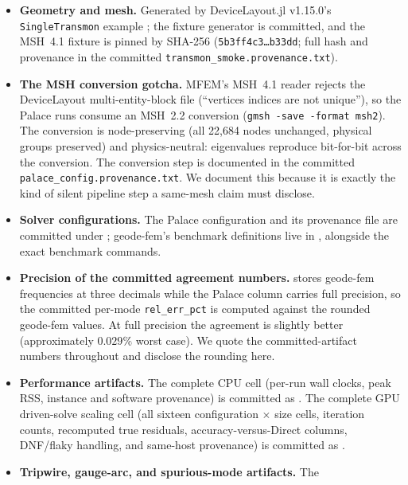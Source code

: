\documentclass{anvil-paper}
\begin{document}
\begin{itemize}
  \item \textbf{Geometry and mesh.} Generated by DeviceLayout.jl v1.15.0's
    \texttt{SingleTransmon} example \citep{devicelayout}; the fixture
    generator is committed, and the MSH~4.1 fixture is pinned by SHA-256
    (\texttt{5b3ff4c3\ldots{}b33dd}; full hash and provenance in the
    committed \texttt{transmon\_smoke.provenance.txt}).
  \item \textbf{The MSH conversion gotcha.} MFEM's MSH~4.1 reader rejects
    the DeviceLayout multi-entity-block file (``vertices indices are not
    unique''), so the Palace runs consume an MSH~2.2 conversion
    (\texttt{gmsh -save -format msh2}). The conversion is node-preserving
    (all 22{,}684 nodes unchanged, physical groups preserved) and
    physics-neutral: eigenvalues reproduce bit-for-bit across the
    conversion. The conversion step is documented in the committed
    \texttt{palace\_config.provenance.txt}. We document this because it is
    exactly the kind of silent pipeline step a same-mesh claim must
    disclose.
  \item \textbf{Solver configurations.} The Palace configuration and its
    provenance file are committed under
    ; geode-fem's benchmark
    definitions live in ,
    alongside the exact benchmark commands.
  \item \textbf{Precision of the committed agreement numbers.}
     stores geode-fem
    frequencies at three decimals while the Palace column carries full
    precision, so the committed per-mode \texttt{rel\_err\_pct} is
    computed against the rounded geode-fem values. At full precision the
    agreement is slightly better (approximately $0.029\%$ worst case). We
    quote the committed-artifact numbers throughout and disclose the
    rounding here.
  \item \textbf{Performance artifacts.} The complete CPU cell
    (per-run wall clocks, peak RSS, instance and software provenance) is
    committed as . The
    complete GPU driven-solve scaling cell (all sixteen configuration
    $\times$ size cells, iteration counts, recomputed true residuals,
    accuracy-versus-Direct columns, DNF/flaky handling, and same-host
    provenance) is committed as
    .
  \item \textbf{Tripwire, gauge-arc, and spurious-mode artifacts.} The

\end{itemize}
\end{document}
